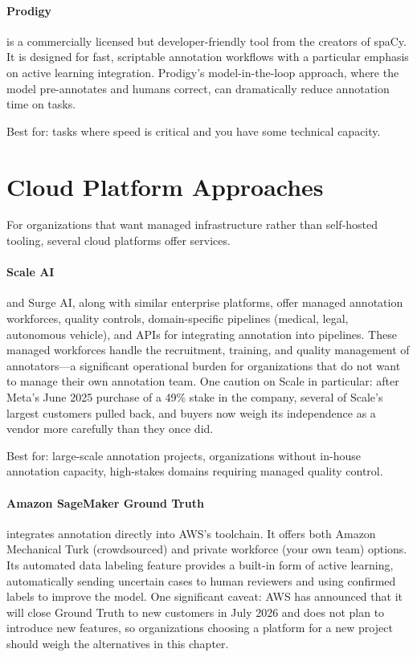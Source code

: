 \paragraph{Prodigy} is a commercially licensed but developer-friendly tool from the creators of spaCy. It is designed for fast, scriptable annotation workflows with a particular emphasis on active learning integration. Prodigy's model-in-the-loop approach, where the model pre-annotates and humans correct, can dramatically reduce annotation time on \nlp tasks.

Best for: \nlp tasks where speed is critical and you have some technical capacity.

\section{Cloud Platform Approaches}
\label{sec:ch09-cloud-platforms}

For organizations that want managed infrastructure rather than self-hosted tooling, several cloud platforms offer \hitl services.

\paragraph{Scale AI} and Surge AI, along with similar enterprise platforms, offer managed annotation workforces, quality controls, domain-specific pipelines (medical, legal, autonomous vehicle), and APIs for integrating annotation into \ml pipelines. These managed workforces handle the recruitment, training, and quality management of annotators---a significant operational burden for organizations that do not want to manage their own annotation team. One caution on Scale in particular: after Meta's June 2025 purchase of a 49\% stake in the company, several of Scale's largest customers pulled back, and buyers now weigh its independence as a vendor more carefully than they once did.

Best for: large-scale annotation projects, organizations without in-house annotation capacity, high-stakes domains requiring managed quality control.

\paragraph{Amazon SageMaker Ground Truth} integrates annotation directly into AWS's \ml toolchain. It offers both Amazon Mechanical Turk (crowdsourced) and private workforce (your own team) options. Its automated data labeling feature provides a built-in form of active learning, automatically sending uncertain cases to human reviewers and using confirmed labels to improve the model. One significant caveat: AWS has announced that it will close Ground Truth to new customers in July 2026 and does not plan to introduce new features, so organizations choosing a platform for a new project should weigh the alternatives in this chapter.

